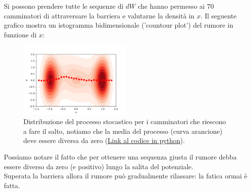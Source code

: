 Si possono prendere tutte le sequenze di $dW$ che hanno permesso ai $70$ camminatori di attraversare la barriera e valutarne la densità in $x$. Il seguente grafico mostra un istogramma bidimensionale ('countour plot') del rumore in funzione di $x$:
\begin{figure}[H]
    \centering
    \includegraphics[width=0.5\textwidth]{figures/lez_12_dist.png}
    \caption{\scriptsize Distribuzione del processo stocastico per i camminatori che riescono a fare il salto, notiamo che la media del processo (curva arancione) deve essere diversa da zero (\href{https://github.com/dodogabrie/Sistemi-Complessi/blob/master/python-project/lezione12/MFPT_simulation_py.ipynb}{Link al codice in python}).}
    \label{fig:figures-lez_12_dist-png}
\end{figure}
\noindent
Possiamo notare il fatto che per ottenere una sequenza giusta il rumore debba essere diverso da zero (e positivo) lungo la salita del potenziale. \\
Superata la barriera allora il rumore può gradualmente rilassare: la fatica ormai è fatta. 


